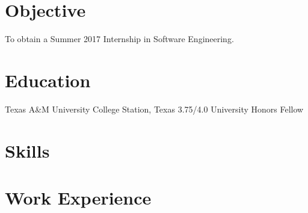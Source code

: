 \documentclass[10pt,a4paper]{moderncv}
\begin{document}
\vspace*{-2\baselineskip}
\makecvtitle
\vspace*{-2\baselineskip}



\section{Objective}

To obtain a Summer 2017 Internship in Software Engineering.

\vspace*{-1\baselineskip}



\section{Education}

{Texas A\&M University}
{College Station, Texas}
{3.75/4.0}
{University Honors Fellow}

\vspace*{-1\baselineskip}



\section{Skills}

\vspace*{-1\baselineskip}



\section{Work Experience}
\end{document}

